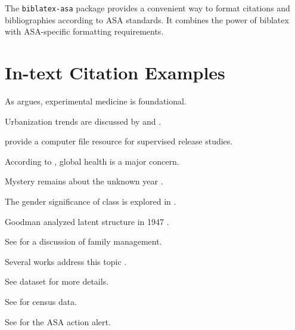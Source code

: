 \documentclass{article}
\begin{document}
The \texttt{biblatex-asa} package provides a convenient way to format citations and bibliographies according to ASA standards. It combines the power of biblatex with ASA-specific formatting requirements.

\nocite{*} %


\section*{In-text Citation Examples}

As \textcite{bernard1957} argues, experimental medicine is foundational.

Urbanization trends are discussed by \textcite{lee2021a} and \textcite{lee2021b}.

\textcite{deschenes2000} provide a computer file resource for supervised release studies.

According to \textcite{who2022}, global health is a major concern.

Mystery remains about the unknown year \parencite{doe_nodate}.

The gender significance of class is explored in \textcite{szelenyiForthcoming}.

Goodman analyzed latent structure in 1947 \parencite{goodman1947a, goodman1947b}.

See \parencite[pp.~63--93]{sampson1992} for a discussion of family management.

Several works address this topic \parencite{brown2022,kao2003,smith2020a}.

See dataset \textcite{charles1990} for more details.

See \textcite{usbc1960} for census data.

See \textcite{asa1997} for the ASA action alert.


\printbibliography[title={REFERENCES}]
\end{document}
